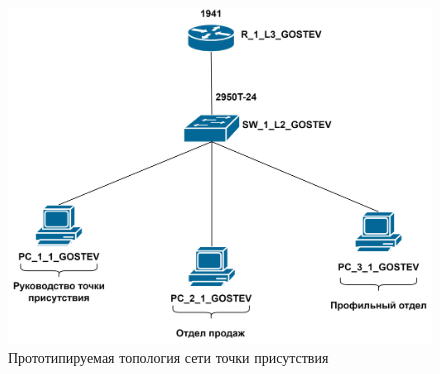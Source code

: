 \documentclass[14pt, a4paper]{extarticle}
\numberwithin{equation}{section}
\begin{document}
\begin{figure}[H]
        \centering
        \includegraphics[scale=0.2]{topo_tp.png}
        \caption{Прототипируемая топология сети точки присутствия}
        \label{fig:tpTopo}
\end{figure}



\begingroup
\let\itshape\upshape
\sloppy
\printbibliography[title=СПИСОК ИСПОЛЬЗУЕМЫХ ИСТОЧНИКОВ]
\endgroup
\end{document}
